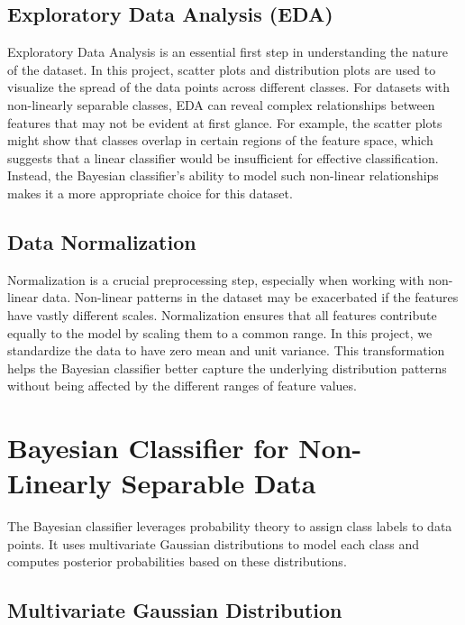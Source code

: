 \documentclass[conference]{IEEEtran}
\begin{document}
	\subsection{Exploratory Data Analysis (EDA)}
	
	Exploratory Data Analysis is an essential first step in understanding the nature of the dataset. In this project, scatter plots and distribution plots are used to visualize the spread of the data points across different classes. For datasets with non-linearly separable classes, EDA can reveal complex relationships between features that may not be evident at first glance. For example, the scatter plots might show that classes overlap in certain regions of the feature space, which suggests that a linear classifier would be insufficient for effective classification. Instead, the Bayesian classifier's ability to model such non-linear relationships makes it a more appropriate choice for this dataset.
	
	\subsection{Data Normalization}
	
	Normalization is a crucial preprocessing step, especially when working with non-linear data. Non-linear patterns in the dataset may be exacerbated if the features have vastly different scales. Normalization ensures that all features contribute equally to the model by scaling them to a common range. In this project, we standardize the data to have zero mean and unit variance. This transformation helps the Bayesian classifier better capture the underlying distribution patterns without being affected by the different ranges of feature values.
	
	\section{Bayesian Classifier for Non-Linearly Separable Data}
	
	The Bayesian classifier leverages probability theory to assign class labels to data points. It uses multivariate Gaussian distributions to model each class and computes posterior probabilities based on these distributions.
	
	\subsection{Multivariate Gaussian Distribution}
	
\end{document}
